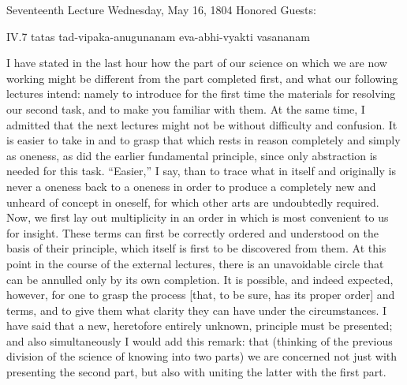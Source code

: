Seventeenth Lecture
Wednesday, May 16, 1804
Honored Guests:

IV.7
tatas tad-vipaka-anugunanam eva-abhi-vyakti vasananam

I have stated in the last hour how
the part of our science on which we are now working
might be different from the part completed first,
and what our following lectures intend:
namely to introduce for the first time
the materials for resolving our second task,
and to make you familiar with them.
At the same time, I admitted that the next lectures
might not be without difficulty and confusion.
It is easier to take in and to grasp
that which rests in reason 
completely and simply as oneness,
as did the earlier fundamental principle,
since only abstraction is needed for this task.
“Easier,” I say, than to trace what
in itself and originally is never a oneness
back to a oneness in order to produce
a completely new and unheard of concept in oneself,
for which other arts are undoubtedly required.
Now, we first lay out multiplicity in an order
in which is most convenient to us for insight.
These terms can first be correctly
ordered and understood on the basis of their principle,
which itself is first to be discovered from them.
At this point in the course of the external lectures,
there is an unavoidable circle that can be annulled
only by its own completion.
It is possible, and indeed expected, however,
for one to grasp the process
[that, to be sure, has its proper order]
and terms, and to give them what clarity
they can have under the circumstances.
I have said that a new, heretofore entirely unknown,
principle must be presented;
and also simultaneously I would add this remark: that
(thinking of the previous division
of the science of knowing into two parts)
we are concerned not just with presenting the second part,
but also with uniting the latter with the first part.

